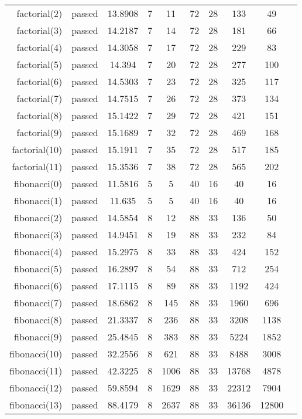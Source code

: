 \begin{longtable}{r|ccccccccc}
    factorial(2) & passed & 13.8908 & 7 & 11 & 72 & 28 & 133 & 49 \\
    factorial(3) & passed & 14.2187 & 7 & 14 & 72 & 28 & 181 & 66 \\
    factorial(4) & passed & 14.3058 & 7 & 17 & 72 & 28 & 229 & 83 \\
    factorial(5) & passed & 14.394 & 7 & 20 & 72 & 28 & 277 & 100 \\
    factorial(6) & passed & 14.5303 & 7 & 23 & 72 & 28 & 325 & 117 \\
    factorial(7) & passed & 14.7515 & 7 & 26 & 72 & 28 & 373 & 134 \\
    factorial(8) & passed & 15.1422 & 7 & 29 & 72 & 28 & 421 & 151 \\
    factorial(9) & passed & 15.1689 & 7 & 32 & 72 & 28 & 469 & 168 \\
    factorial(10) & passed & 15.1911 & 7 & 35 & 72 & 28 & 517 & 185 \\
    factorial(11) & passed & 15.3536 & 7 & 38 & 72 & 28 & 565 & 202 \\
    fibonacci(0) & passed & 11.5816 & 5 & 5 & 40 & 16 & 40 & 16 \\
    fibonacci(1) & passed & 11.635 & 5 & 5 & 40 & 16 & 40 & 16 \\
    fibonacci(2) & passed & 14.5854 & 8 & 12 & 88 & 33 & 136 & 50 \\
    fibonacci(3) & passed & 14.9451 & 8 & 19 & 88 & 33 & 232 & 84 \\
    fibonacci(4) & passed & 15.2975 & 8 & 33 & 88 & 33 & 424 & 152 \\
    fibonacci(5) & passed & 16.2897 & 8 & 54 & 88 & 33 & 712 & 254 \\
    fibonacci(6) & passed & 17.1115 & 8 & 89 & 88 & 33 & 1192 & 424 \\
    fibonacci(7) & passed & 18.6862 & 8 & 145 & 88 & 33 & 1960 & 696 \\
    fibonacci(8) & passed & 21.3337 & 8 & 236 & 88 & 33 & 3208 & 1138 \\
    fibonacci(9) & passed & 25.4845 & 8 & 383 & 88 & 33 & 5224 & 1852 \\
    fibonacci(10) & passed & 32.2556 & 8 & 621 & 88 & 33 & 8488 & 3008 \\
    fibonacci(11) & passed & 42.3225 & 8 & 1006 & 88 & 33 & 13768 & 4878 \\
    fibonacci(12) & passed & 59.8594 & 8 & 1629 & 88 & 33 & 22312 & 7904 \\
    fibonacci(13) & passed & 88.4179 & 8 & 2637 & 88 & 33 & 36136 & 12800 \\

\end{longtable}
